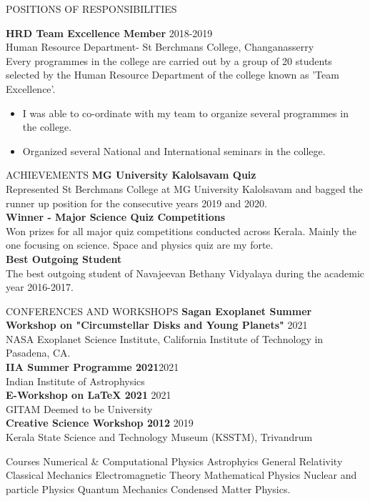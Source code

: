 \documentclass{resume} %
\begin{document}
\begin{rSection}{POSITIONS OF RESPONSIBILITIES}
	
	\textbf{HRD Team Excellence Member } \hfill 2018-2019\\
	Human Resource Department- St Berchmans College, Changanasserry \\
	Every programmes in the college are carried out by a group of 20 students selected by the Human Resource Department of the college known as 'Team Excellence'. 
	\begin{itemize}[noitemsep,topsep=-0.2cm]
		\itemsep-0.05cm
		\item I was able to co-ordinate with my team to organize several programmes in the college. 
		\item Organized several National and International seminars in the college. 
	\end{itemize}
\end{rSection}

\begin{rSection}{ACHIEVEMENTS }
\textbf{MG University Kalolsavam Quiz}\\
Represented St Berchmans College at MG University Kalolsavam and bagged the runner up position for the consecutive years 2019 and 2020. \\
\textbf{Winner - Major Science  Quiz Competitions }\\
Won prizes for all major quiz competitions conducted across Kerala. Mainly the one focusing on science. Space and physics quiz are my forte.\\
\textbf{Best Outgoing Student}\\
The best outgoing student of Navajeevan Bethany Vidyalaya during the academic year 2016-2017.\\
\end{rSection} 


\begin{rSection}{CONFERENCES AND WORKSHOPS }
	\textbf{Sagan Exoplanet Summer Workshop on "Circumstellar Disks and Young Planets"} \hfill 2021\\
	NASA Exoplanet Science Institute, California Institute of Technology in Pasadena, CA.  \\
	\textbf{IIA Summer Programme 2021}\hfill 2021\\
	Indian Institute of Astrophysics  \\
	\textbf{E-Workshop on LaTeX 2021 }\hfill 2021\\
	GITAM Deemed to be University \\
	\textbf{Creative Science Workshop 2012 } \hfill 2019\\
	Kerala State Science and Technology Museum (KSSTM), Trivandrum \\
\end{rSection}


\begin{rSection}{Courses}
	Numerical \& Computational Physics \textbar{} Astrophyics \textbar{} General Relativity \textbar{} Classical Mechanics \textbar{} Electromagnetic Theory \textbar{} Mathematical Physics \textbar{} Nuclear and particle Physics \textbar{}
	Quantum Mechanics \textbar{} Condensed Matter Physics.
\end{rSection}
\end{document}
